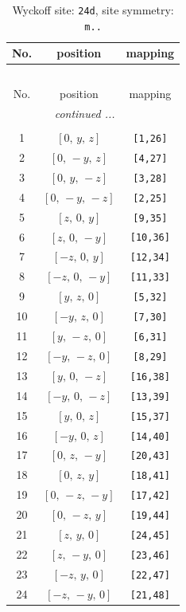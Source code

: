 \documentclass[fleqn,8pt]{jsarticle}
\begin{document}
\begin{longtable}{ccc}
\caption{Wyckoff site: {\tt 24d}, site symmetry: {\tt m..}}
 \\
 \hline \hline
No. & position & mapping \\ \hline \endfirsthead

\multicolumn{2}{l}{\tablename\ \thetable{}} \\
 \hline \hline
No. & position & mapping \\ \hline \endhead

 \hline \hline
\multicolumn{2}{r}{\footnotesize\it continued ...} \\ \endfoot

 \hline \hline
\multicolumn{2}{r}{} \\ \endlastfoot

1 & $\left[ 0,\, y,\, z \right]$ & {\tt [1,26]} \\ \hline
2 & $\left[ 0,\, - y,\, z \right]$ & {\tt [4,27]} \\ \hline
3 & $\left[ 0,\, y,\, - z \right]$ & {\tt [3,28]} \\ \hline
4 & $\left[ 0,\, - y,\, - z \right]$ & {\tt [2,25]} \\ \hline
5 & $\left[ z,\, 0,\, y \right]$ & {\tt [9,35]} \\ \hline
6 & $\left[ z,\, 0,\, - y \right]$ & {\tt [10,36]} \\ \hline
7 & $\left[ - z,\, 0,\, y \right]$ & {\tt [12,34]} \\ \hline
8 & $\left[ - z,\, 0,\, - y \right]$ & {\tt [11,33]} \\ \hline
9 & $\left[ y,\, z,\, 0 \right]$ & {\tt [5,32]} \\ \hline
10 & $\left[ - y,\, z,\, 0 \right]$ & {\tt [7,30]} \\ \hline
11 & $\left[ y,\, - z,\, 0 \right]$ & {\tt [6,31]} \\ \hline
12 & $\left[ - y,\, - z,\, 0 \right]$ & {\tt [8,29]} \\ \hline
13 & $\left[ y,\, 0,\, - z \right]$ & {\tt [16,38]} \\ \hline
14 & $\left[ - y,\, 0,\, - z \right]$ & {\tt [13,39]} \\ \hline
15 & $\left[ y,\, 0,\, z \right]$ & {\tt [15,37]} \\ \hline
16 & $\left[ - y,\, 0,\, z \right]$ & {\tt [14,40]} \\ \hline
17 & $\left[ 0,\, z,\, - y \right]$ & {\tt [20,43]} \\ \hline
18 & $\left[ 0,\, z,\, y \right]$ & {\tt [18,41]} \\ \hline
19 & $\left[ 0,\, - z,\, - y \right]$ & {\tt [17,42]} \\ \hline
20 & $\left[ 0,\, - z,\, y \right]$ & {\tt [19,44]} \\ \hline
21 & $\left[ z,\, y,\, 0 \right]$ & {\tt [24,45]} \\ \hline
22 & $\left[ z,\, - y,\, 0 \right]$ & {\tt [23,46]} \\ \hline
23 & $\left[ - z,\, y,\, 0 \right]$ & {\tt [22,47]} \\ \hline
24 & $\left[ - z,\, - y,\, 0 \right]$ & {\tt [21,48]} \\
\end{longtable}
\end{document}
